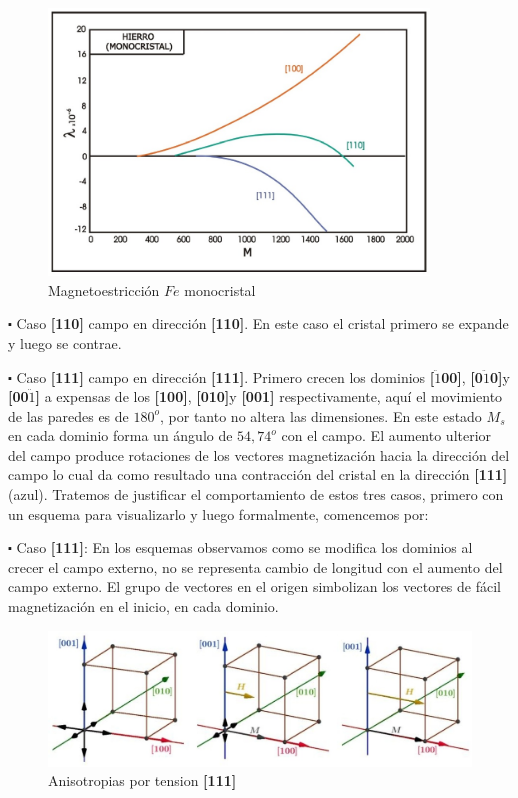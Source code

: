 \begin{figure}[H]
    \centering
    \includegraphics[width=0.9\textwidth]{./Figures/hierroMonocristal}
	\caption{Magnetoestricción $Fe$ monocristal}
	\label{fig:hierroMonocristal}
\end{figure} 

$\centerdot$ Caso \textbf{[110]} campo en dirección \textbf{[110]}. En este caso el cristal primero se expande y luego se contrae.


$\centerdot$ Caso \textbf{[111]} campo en dirección \textbf{[111]}. Primero crecen los dominios \textbf{[$\ddot{1}$00]}, \textbf{[0$\ddot{1}$0]}y \textbf{[00$\ddot{1}$]} a expensas de los \textbf{[100]}, \textbf{[010]}y \textbf{[001]} respectivamente, aquí el movimiento de las paredes es de $180^{o}$, por tanto no altera las
dimensiones. En este estado $M_{s}$ en cada dominio forma un ángulo de $54,74^{o}$ con el campo. El aumento ulterior del campo produce rotaciones de los vectores magnetización hacia la dirección del campo lo cual da como resultado una contracción del cristal en la dirección \textbf{[111]} (azul).
Tratemos de justificar el comportamiento de estos tres casos, primero con un esquema para visualizarlo y luego formalmente, comencemos por: 

$\centerdot$ Caso \textbf{[111]}: En los esquemas observamos como se modifica los dominios al crecer el campo externo, no se representa cambio de longitud con el aumento del campo externo. El grupo de vectores en el origen simbolizan los vectores de fácil magnetización en el inicio, en cada dominio.



\begin{figure}[H]
    \centering
    \includegraphics[width=1.0\textwidth]{./Figures/anisotropiasPorTension1}
	\caption{Anisotropias por tension \textbf{[111]} }
	\label{fig:anisotropiasPorTension1}
\end{figure}

